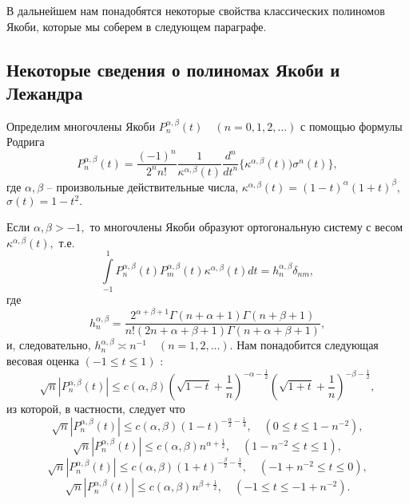 В дальнейшем нам понадобятся некоторые свойства классических полиномов Якоби, которые мы соберем в следующем параграфе.

\subsection{Некоторые сведения о полиномах Якоби и Лежандра}

Определим многочлены Якоби $P_{n}^{\alpha,\beta}(t) \quad (n=0,1,2,\dots)$ с помощью формулы Родрига
\begin{equation*}
P_{n}^{\alpha,\beta}(t) = \frac{(-1)^n}{2^{n}n!}\frac{1}{\kappa^{\alpha,\beta}(t)}\frac{d^n}{dt^{n}}\{ \kappa^{\alpha,\beta}(t))\sigma^n(t) \},
\end{equation*}
где $\alpha,\beta$ -- произвольные действительные числа, $\kappa^{\alpha,\beta}(t)=(1-t)^{\alpha} (1+t)^{\beta},$ $\sigma(t)=1-t^2.$

Если $\alpha,\beta > -1,$ то многочлены Якоби образуют ортогональную систему с весом $\kappa^{\alpha,\beta}(t),$ т.е.
\begin{equation*}
\int\limits_{-1}^{1} P_{n}^{\alpha,\beta}(t)P_{m}^{\alpha,\beta}(t)\kappa^{\alpha,\beta}(t)dt = h_n^{\alpha,\beta}\delta_{nm},
\end{equation*}
где
\begin{equation*}
h_n^{\alpha,\beta} = \frac{2^{\alpha+\beta+1}\Gamma(n+\alpha+1)\Gamma(n+\beta+1)}{n! (2n+\alpha+\beta+1)\Gamma(n+\alpha+\beta+1)},
\end{equation*}
и, следовательно, $h_n^{\alpha,\beta} \asymp n^{-1} \quad (n=1,2,\dots)$. Нам понадобится следующая весовая оценка $(-1 \leq t \leq 1)$ \cite{Sego}:
\begin{equation}
\label{SultM_eq4}
\sqrt{n}\left|P_{n}^{\alpha,\beta}(t)\right| \leq c(\alpha, \beta) \left( \sqrt{1-t} + \frac{1}{n} \right)^{-\alpha-\frac{1}{2}} \left( \sqrt{1+t} + \frac{1}{n} \right)^{-\beta-\frac{1}{2}},
\end{equation}
из которой, в частности, следует что
\begin{equation*}
\sqrt{n}\left|P_{n}^{\alpha,\beta}(t)\right| \leq c(\alpha, \beta) (1-t)^{-\frac{\alpha}{2}-\frac{1}{4}}, \quad (0 \leq t \leq 1 - n^{-2}),
\end{equation*}
\begin{equation*}
\sqrt{n}\left|P_{n}^{\alpha,\beta}(t)\right| \leq c(\alpha, \beta) n^{\alpha+\frac{1}{2}}, \quad (1 - n^{-2} \leq t \leq 1),
\end{equation*}
\begin{equation*}
\sqrt{n}\left|P_{n}^{\alpha,\beta}(t)\right| \leq c(\alpha, \beta) (1+t)^{-\frac{\beta}{2}-\frac{1}{4}}, \quad (- 1 + n^{-2} \leq t \leq 0),
\end{equation*}
\begin{equation*}
\sqrt{n}\left|P_{n}^{\alpha,\beta}(t)\right| \leq c(\alpha, \beta) n^{\beta+\frac{1}{2}}, \quad (-1 \leq t \leq - 1 + n^{-2}).
\end{equation*}


